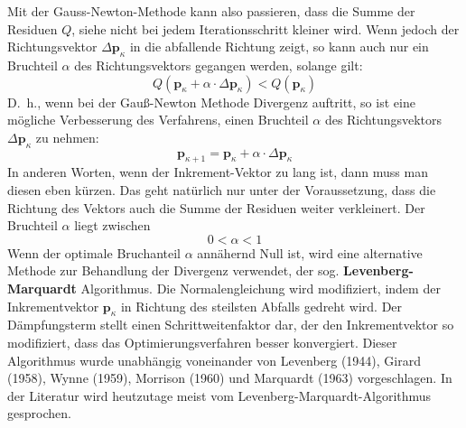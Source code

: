 Mit der Gauss-Newton-Methode kann also passieren, dass die Summe der Residuen $Q$, siehe  nicht bei jedem Iterationsschritt kleiner
wird. Wenn jedoch der Richtungsvektor $\Delta \mathbf{p}_{\kappa}$ in die abfallende Richtung
zeigt, so kann auch nur ein Bruchteil $\alpha$ des Richtungsvektors gegangen 
werden, solange gilt:
\begin{equation}
Q(\mathbf{p}_{\kappa} + \alpha \cdot \Delta \mathbf{p}_{\kappa}) < Q(\mathbf{p}_{\kappa})
\end{equation}
D.~h., wenn bei der Gauß-Newton Methode Divergenz auftritt, so ist eine 
mögliche Verbesserung des Verfahrens, einen Bruchteil $\alpha$ des Richtungsvektors $\Delta\mathbf{p}_{\kappa}$ zu nehmen: 
\begin{equation}
\mathbf{p}_{\kappa+1}= \mathbf{p}_{\kappa} + \alpha \cdot \Delta\mathbf{p}_{\kappa}
\end{equation}
In anderen Worten, wenn der Inkrement-Vektor zu lang ist, dann muss man diesen
eben kürzen. Das geht natürlich nur unter der Voraussetzung, dass die Richtung 
des Vektors auch die Summe der Residuen weiter verkleinert. Der Bruchteil $\alpha$
liegt zwischen 
\[
0 < \alpha < 1
\] 
Wenn der optimale Bruchanteil $\alpha$ annähernd Null ist, wird eine alternative Methode zur Behandlung der Divergenz verwendet, der sog. \textbf{Levenberg-Marquardt}
Algorithmus. 
Die Normalengleichung wird modifiziert, indem der Inkrementvektor $\mathbf{p}_{\kappa}$ in Richtung des steilsten Abfalls gedreht wird. Der Dämpfungsterm stellt einen Schrittweitenfaktor dar, der den Inkrementvektor
so modifiziert, dass das Optimierungsverfahren besser konvergiert. Dieser
Algorithmus wurde unabhängig voneinander von Levenberg (1944), Girard (1958), Wynne (1959), 
Morrison (1960) und Marquardt (1963) vorgeschlagen. In der Literatur wird heutzutage meist vom 
Levenberg-Marquardt-Algorithmus gesprochen.

